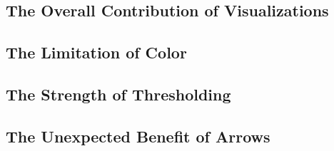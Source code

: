 \subsection{The Overall Contribution of Visualizations}

\subsection{The Limitation of Color}

\subsection{The Strength of Thresholding}

\subsection{The Unexpected Benefit of Arrows}